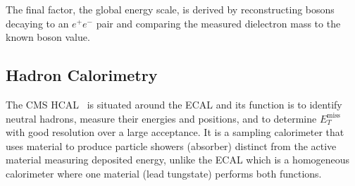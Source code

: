The final factor, the global energy scale, is derived by reconstructing \Z bosons decaying to an $e^{+}e^{-}$ pair and comparing the measured dielectron mass to the known \Z boson value.














\subsection{Hadron Calorimetry}
The CMS HCAL~\cite{cmsHcal} is situated around the ECAL and its function is to identify neutral hadrons, measure their energies and positions, and to determine $E_{T}^{\mathrm{miss}}$ with good resolution over a large acceptance.
It is a sampling calorimeter that uses material to produce particle showers (absorber) distinct from the active material measuring deposited energy, unlike the ECAL which is a homogeneous calorimeter where one material (lead tungstate) performs both functions. 

